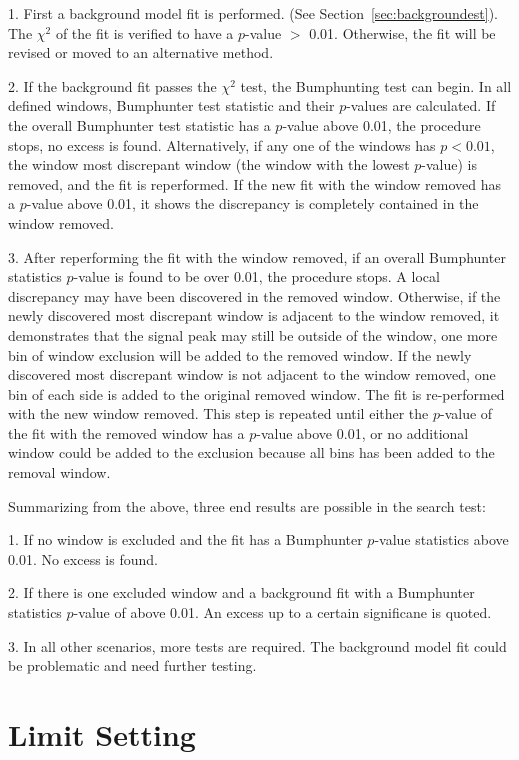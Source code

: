     1.  First a background model fit is performed. (See Section~\ref{sec:backgroundest}). The $\chi^{2}$ of the fit is verified to have a $p$-value $>$ 0.01. Otherwise, the fit will be revised or moved to an alternative method.

    2.  If the background fit passes the $\chi^{2}$ test, the Bumphunting test can begin. In all defined windows, Bumphunter test statistic and their $p$-values are calculated. If the overall Bumphunter test statistic has a $p$-value above 0.01, the procedure stops, no excess is found. Alternatively, if any one of the windows has  $p< 0.01$, the window most discrepant window (the window with the lowest $p$-value) is removed, and the fit is reperformed. If the new fit with the window removed has a $p$-value above 0.01, it shows the discrepancy is completely contained in the window removed.

    3. After reperforming the fit with the window removed, if an overall Bumphunter statistics $p$-value is found to be over 0.01, the procedure stops. A local discrepancy may have been discovered in the removed window. Otherwise, if the newly discovered most discrepant window is adjacent to the window removed, it demonstrates that the signal peak may still be outside of the window, one more bin of window exclusion will be added to the removed window. If the newly discovered most discrepant window is not adjacent to the window removed, one bin of each side is added to the original removed window. The fit is re-performed with the new window removed. This step is repeated until either the $p$-value of the fit with the removed window has a $p$-value above 0.01, or no additional window could be added to the exclusion because all bins has been added to the removal window.

    Summarizing from the above, three end results are possible in the search test:

    1. If no window is excluded and the fit has a Bumphunter $p$-value statistics above 0.01. No excess is found. 

    2. If there is one excluded window and a background fit with a Bumphunter statistics $p$-value of above 0.01. An excess up to a certain significane is quoted.

    3. In all other scenarios, more tests are required. The background model fit could be problematic and need further testing.  

\section{Limit Setting}
\label{sec:limits}

